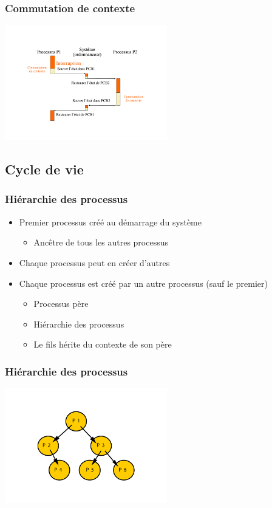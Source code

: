 \begin{frame}
\frametitle{Commutation de contexte}
\includegraphics[height=5cm]{../illustration/commutation_contexte.pdf}
\end{frame}

\subsection{Cycle de vie}

\begin{frame}
\frametitle{Hiérarchie des processus}
\begin{itemize}
\item Premier processus créé au démarrage du système
\begin{itemize}
\item Ancêtre de tous les autres processus
\end{itemize}
\item Chaque processus peut en créer d’autres
\item Chaque processus est créé par un autre processus (sauf le premier)
\begin{itemize}
\item Processus père
\item Hiérarchie des processus
\item Le fils hérite du contexte de son père
\end{itemize}
\end{itemize}
\end{frame}


\begin{frame}
\frametitle{Hiérarchie des processus}
\includegraphics[height=5cm]{../illustration/process_hierarchie.pdf}
\end{frame}


